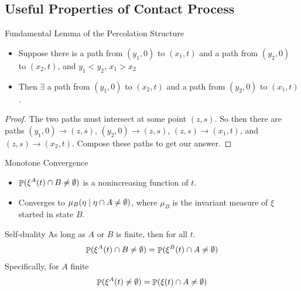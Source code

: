 \documentclass{beamer}
\begin{document}
\subsection{Useful Properties of Contact Process}

\begin{frame}{Fundamental Lemma of the Percolation Structure}
  \begin{lemma}
    \begin{itemize}
      \item Suppose there is a path from $(y_{1},0)$ to $(x_{1},t)$ and a path from $(y_{2},0)$ to $(x_{2},t)$, and $y_{1} < y_{2}$, $x_{1} > x_{2}$
      \pause
      \item Then $\exists$ a path from $(y_{1},0)$ to $(x_{2},t)$ and a path from $(y_{2},0)$ to $(x_{1},t)$.
    \end{itemize}
  \end{lemma}
  \pause
  \begin{proof}
    The two paths must intersect at some point $(z,s)$. So then there are paths $(y_{1},0) \to (z,s)$, $(y_{2},0) \to (z,s)$, $(z,s) \to (x_{1},t)$, and $(z,s) \to (x_{2},t)$. Compose these paths to get our answer.
  \end{proof}
\end{frame}

\begin{frame}{Monotone Convergence}
  \begin{itemize}
    \item $\mathop{\mathbb{P}}(\xi^{A}(t) \cap B \neq \emptyset)$ is a nonincreasing function of $t$.
      \pause
    \item Converges to $\mu_{B}(\eta \mid \eta \cap A \neq \emptyset)$, where $\mu_{B}$ is the invariant measure of $\xi$ started in state $B$.
  \end{itemize}
\end{frame}

\begin{frame}{Self-duality}
  As long as $A$ or $B$ is finite, then for all $t$.
  \begin{equation}
    \mathop{\mathbb{P}}(\xi^{A}(t) \cap B \neq \emptyset) = \mathop{\mathbb{P}}(\xi^{B}(t) \cap A \neq \emptyset)
  \end{equation}
  \pause
  Specifically, for $A$ finite
  \begin{equation}
    \mathop{\mathbb{P}}(\xi^{A}(t) \neq \emptyset) = \mathop{\mathbb{P}}(\xi(t) \cap A \neq \emptyset)
  \end{equation}
\end{frame}
\end{document}
